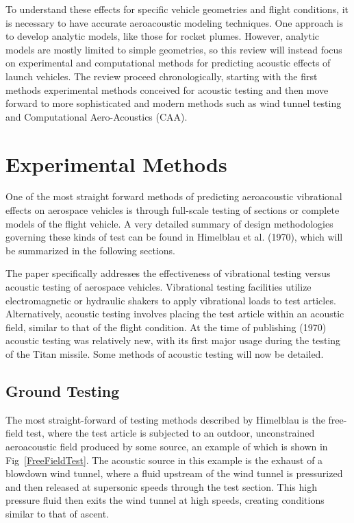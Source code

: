 \documentclass[]{aiaa-tc}%
\begin{document}
To understand these effects for specific vehicle geometries and flight conditions, it is necessary to have accurate aeroacoustic modeling techniques.  One approach is to develop analytic models, like those for rocket plumes\cite{AcousticPropulsionLoads}.  However, analytic models are mostly limited to simple geometries, so this review will instead focus on experimental and computational methods for predicting acoustic effects of launch vehicles.  The review proceed chronologically, starting with the first methods experimental methods conceived for acoustic testing and then move forward to more sophisticated and modern methods such as wind tunnel testing and Computational Aero-Acoustics (CAA).


\section{Experimental Methods}

One of the most straight forward methods of predicting aeroacoustic vibrational effects on aerospace vehicles is through full-scale testing of sections or complete models of the flight vehicle.  A very detailed summary of design methodologies governing these kinds of test can be found in Himelblau et al. (1970), \cite{SpaceVehicleAeroacousticVibrationPrediction} which will be summarized in the following sections.

The paper specifically addresses the effectiveness of vibrational testing versus acoustic testing of aerospace vehicles.  Vibrational testing facilities utilize electromagnetic or hydraulic shakers to apply vibrational loads to test articles.  Alternatively, acoustic testing involves placing the test article within an acoustic field, similar to that of the flight condition.  At the time of publishing (1970) acoustic testing was relatively new, with its first major usage during the testing of the Titan missile.  Some methods of acoustic testing will now be detailed.


\subsection{Ground Testing}

The most straight-forward of testing methods described by Himelblau is the free-field test, where the test article is subjected to an outdoor, unconstrained aeroacoustic field produced by some source, an example of which is shown in Fig~\ref{FreeFieldTest}.  The acoustic source in this example is the exhaust of a blowdown wind tunnel, where a fluid upstream of the wind tunnel is pressurized and then released at supersonic speeds through the test section.\cite{BlowdownWindTunnel}  This high pressure fluid then exits the wind tunnel at high speeds, creating conditions similar to that of ascent.
\end{document}
